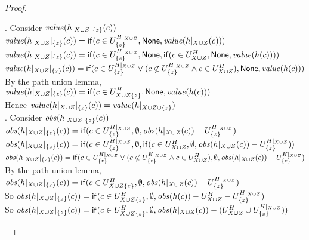\begin{proof}
\begin{tabbedproof}
. Consider $\mathit{value}(h|_{X \cup Z}|_{\{{z}\}}(c))$ \\
\ooooo $\mathit{value}(h|_{X \cup Z}|_{\{{z}\}}(c)) = \mathsf{if}({c \in U^{H|_{X \cup Z}}_{\{{z}\}}}, {\mathsf{None}}, {\mathit{value}(h|_{X \cup Z}(c))})$ \\
\ooooo $\mathit{value}(h|_{X \cup Z}|_{\{{z}\}}(c)) = \mathsf{if}({c \in U^{H|_{X \cup Z}}_{\{{z}\}}}, {\mathsf{None}}, {\mathsf{if}({c \in U^H_{X \cup Z}}, {\mathsf{None}}, {\mathit{value}(h(c))})})$ \\
\ooooo $\mathit{value}(h|_{X \cup Z}|_{\{{z}\}}(c)) = \mathsf{if}({c \in U^{H|_{X \cup Z}}_{\{{z}\}} \vee (c \not\in U^{H|_{X \cup Z}}_{\{{z}\}} \land c \in U^H_{X \cup Z})}, {\mathsf{None}}, {\mathit{value}(h(c))})$ \\
\ooooo By the path union lemma, \\
\ooooox $\mathit{value}(h|_{X \cup Z}|_{\{{z}\}}(c)) = \mathsf{if}({c \in U^H_{X \cup Z \{{z}\}}}, {\mathsf{None}}, {\mathit{value}(h(c))})$ \\
\ooooo Hence $\mathit{value}(h|_{X \cup Z}|_{\{{z}\}}(c)) = \mathit{value}(h|_{X \cup Z \cup \{{z}\}})$ \\
. Consider $\mathit{obs}(h|_{X \cup Z}|_{\{{z}\}}(c))$ \\
\ooooo $\mathit{obs}(h|_{X \cup Z}|_{\{{z}\}}(c)) = \mathsf{if}({c \in U^{H|_{X \cup Z}}_{\{{z}\}}}, {\emptyset}, {\mathit{obs}(h|_{X \cup Z}(c)) - U^{H|_{X \cup Z}}_{\{{z}\}}})$ \\
\ooooo $\mathit{obs}(h|_{X \cup Z}|_{\{{z}\}}(c)) = \mathsf{if}({c \in U^{H|_{X \cup Z}}_{\{{z}\}}}, {\emptyset}, {\mathsf{if}({c \in U^H_{X \cup Z}}, {\emptyset}, {\mathit{obs}(h|_{X \cup Z}(c)) - U^{H|_{X \cup Z}}_{\{{z}\}}})})$ \\
\ooooo $\mathit{obs}(h|_{X \cup Z}|_{\{{z}\}}(c)) = \mathsf{if}({c \in U^{H|_{X \cup Z}}_{\{{z}\}} \vee (c \not\in U^{H|_{X \cup Z}}_{\{{z}\}} \land c \in U^H_{X \cup Z})}, {\emptyset}, {\mathit{obs}(h|_{X \cup Z}(c)) - U^{H|_{X \cup Z}}_{\{{z}\}}})$ \\
\ooooo By the path union lemma, \\
\ooooox $\mathit{obs}(h|_{X \cup Z}|_{\{{z}\}}(c)) = \mathsf{if}({c \in U^H_{X \cup Z \{{z}\}}}, {\emptyset}, {\mathit{obs}(h|_{X \cup Z}(c)) - U^{H|_{X \cup Z}}_{\{{z}\}}})$ \\
\ooooo So $\mathit{obs}(h|_{X \cup Z}|_{\{{z}\}}(c)) = \mathsf{if}({c \in U^H_{X \cup Z \{{z}\}}}, {\emptyset}, {\mathit{obs}(h(c)) - U^H_{X \cup Z} - U^{H|_{X \cup Z}}_{\{{z}\}}})$ \\
\ooooo So $\mathit{obs}(h|_{X \cup Z}|_{\{{z}\}}(c)) = \mathsf{if}({c \in U^H_{X \cup Z \{{z}\}}}, {\emptyset}, {\mathit{obs}(h|_{X \cup Z}(c)) - (U^H_{X \cup Z} \cup U^{H|_{X \cup Z}}_{\{{z}\}})})$ \\

\end{tabbedproof}
\end{proof}
